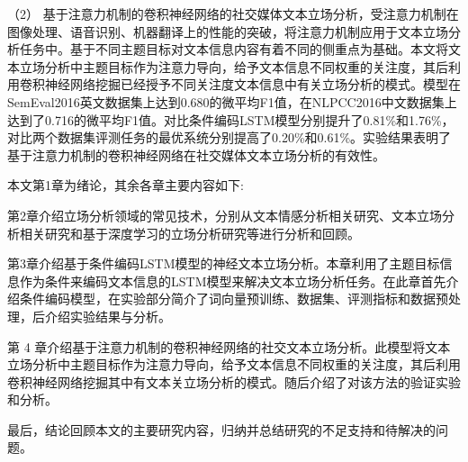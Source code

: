 （2） 基于注意力机制的卷积神经网络的社交媒体文本立场分析，受注意力机制在图像处理、语音识别、机器翻译上的性能的突破，将注意力机制应用于文本立场分析任务中。基于不同主题目标对文本信息内容有着不同的侧重点为基础。本文将文本立场分析中主题目标作为注意力导向，给予文本信息不同权重的关注度，其后利用卷积神经网络挖掘已经授予不同关注度文本信息中有关立场分析的模式。模型在SemEval2016英文数据集上达到0.680的微平均F1值，在NLPCC2016中文数据集上达到了0.716的微平均F1值。对比条件编码LSTM模型分别提升了0.81\%和1.76\%，对比两个数据集评测任务的最优系统分别提高了0.20\%和0.61\%。实验结果表明了基于注意力机制的卷积神经网络在社交媒体文本立场分析的有效性。

本文第1章为绪论，其余各章主要内容如下:

第2章介绍立场分析领域的常见技术，分别从文本情感分析相关研究、文本立场分析相关研究和基于深度学习的立场分析研究等进行分析和回顾。

第3章介绍基于条件编码LSTM模型的神经文本立场分析。本章利用了主题目标信息作为条件来编码文本信息的LSTM模型来解决文本立场分析任务。在此章首先介绍条件编码模型，在实验部分简介了词向量预训练、数据集、评测指标和数据预处理，后介绍实验结果与分析。

第 4 章介绍基于注意力机制的卷积神经网络的社交文本立场分析。此模型将文本立场分析中主题目标作为注意力导向，给予文本信息不同权重的关注度，其后利用卷积神经网络挖掘其中有文本关立场分析的模式。随后介绍了对该方法的验证实验和分析。

最后，结论回顾本文的主要研究内容，归纳并总结研究的不足支持和待解决的问题。

